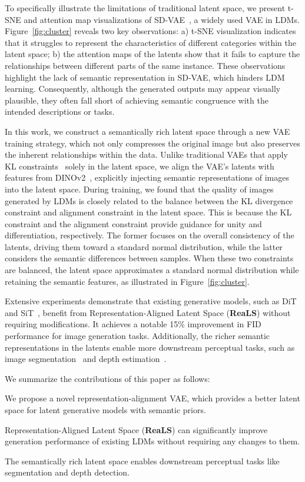 To specifically illustrate the limitations of traditional latent space, we present t-SNE and attention map visualizations of SD-VAE~\cite{rombach2022high}, a widely used VAE in LDMs. Figure~\ref{fig:cluster} reveals two key observations: a) t-SNE visualization indicates that it struggles to represent the characteristics of different categories within the latent space; b) the attention maps of the latents show that it fails to capture the relationships between different parts of the same instance. These observations highlight the lack of semantic representation in SD-VAE, which hinders LDM learning. Consequently, although the generated outputs may appear visually plausible, they often fall short of achieving semantic congruence with the intended descriptions or tasks. 

In this work, we construct a semantically rich latent space through a new VAE training strategy, which not only compresses the original image but also preserves the inherent relationships within the data. Unlike traditional VAEs that apply KL constraints~\cite{doersch2016tutorial} solely in the latent space, we align the VAE's latents with features from DINOv2~\cite{oquab2023dinov2}, explicitly injecting semantic representations of images into the latent space. During training, we found that the quality of images generated by LDMs is closely related to the balance between the KL divergence constraint and alignment constraint in the latent space. This is because the KL constraint and the alignment constraint provide guidance for unity and differentiation, respectively. The former focuses on the overall consistency of the latents, driving them toward a standard normal distribution, while the latter considers the semantic differences between samples. When these two constraints are balanced, the latent space approximates a standard normal distribution while retaining the semantic features, as illustrated in Figure~\ref{fig:cluster}.

Extensive experiments demonstrate that existing generative models, such as DiT~\cite{dit} and SiT~\cite{sit}, benefit from Representation-Aligned Latent Space (\textbf{ReaLS}) without requiring modifications. It achieves a notable 15\% improvement in FID performance for image generation tasks. Additionally, the richer semantic representations in the latents enable more downstream perceptual tasks, such as image segmentation~\cite{minaee2021image} and depth estimation~\cite{ming2021deep}.

We summarize the contributions of this paper as follows:
\vspace{-0.15cm}
\begin{compactitem}
  \item We propose a novel representation-alignment VAE, which provides a better latent space for latent generative models with semantic priors.
  \item Representation-Aligned Latent Space (\textbf{ReaLS}) can significantly improve generation performance of existing LDMs without requiring any changes to them.
  \item The semantically rich latent space enables downstream perceptual tasks like segmentation and depth detection.
\end{compactitem}

